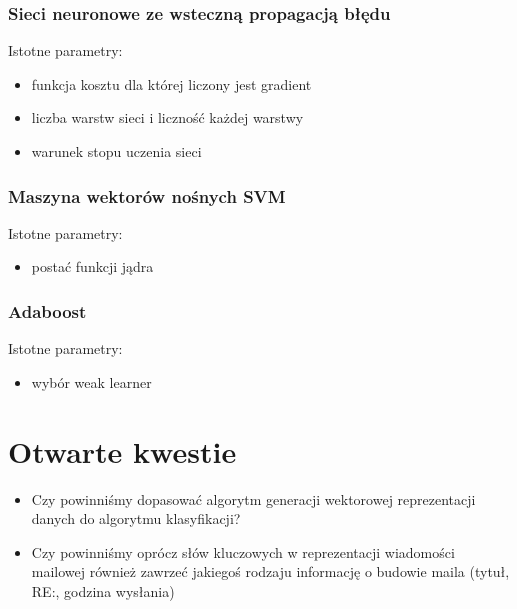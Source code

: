 \documentclass[fleqn]{article}
\begin{document}
\subsubsection{Sieci neuronowe ze wsteczną propagacją błędu}
Istotne parametry: 
\begin{itemize}
    \item funkcja kosztu dla której liczony jest gradient
    \item liczba warstw sieci i liczność każdej warstwy
    \item warunek stopu uczenia sieci
\end{itemize}

\subsubsection{Maszyna wektorów nośnych SVM}
Istotne parametry: 
\begin{itemize}
    \item postać funkcji jądra
\end{itemize}

\subsubsection{Adaboost}
Istotne parametry: 
\begin{itemize}
    \item wybór weak learner
\end{itemize}




\section{Otwarte kwestie}
\begin{itemize}
    \item Czy powinniśmy dopasować algorytm generacji wektorowej reprezentacji danych do algorytmu klasyfikacji?
    \item Czy powinniśmy oprócz słów kluczowych w reprezentacji wiadomości mailowej również zawrzeć jakiegoś rodzaju informację o budowie maila (tytuł, RE:, godzina wysłania)
\end{itemize}
\end{document}
